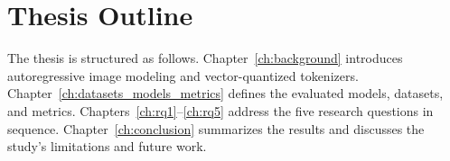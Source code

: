 \section{Thesis Outline}
\label{sec:thesis_outline}

The thesis is structured as follows. Chapter~\ref{ch:background} introduces
autoregressive image modeling and vector-quantized tokenizers.
Chapter~\ref{ch:datasets_models_metrics} defines the evaluated models,
datasets, and metrics. Chapters~\ref{ch:rq1}--\ref{ch:rq5} address the five
research questions in sequence. Chapter~\ref{ch:conclusion} summarizes the
results and discusses the study's limitations and future work.
